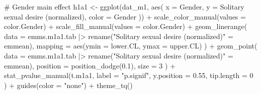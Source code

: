 \documentclass[
  bookmarksnumbered]{article}
\newenvironment{Shaded}{\begin{snugshade}}{\end{snugshade}}
\newcommand{\AttributeTok}[1]{\textcolor[rgb]{0.80,0.80,0.80}{#1}}
\newcommand{\CommentTok}[1]{\textcolor[rgb]{0.50,0.62,0.50}{#1}}
\newcommand{\DecValTok}[1]{\textcolor[rgb]{0.86,0.86,0.80}{#1}}
\newcommand{\FloatTok}[1]{\textcolor[rgb]{0.75,0.75,0.82}{#1}}
\newcommand{\FunctionTok}[1]{\textcolor[rgb]{0.94,0.94,0.56}{#1}}
\newcommand{\NormalTok}[1]{\textcolor[rgb]{0.80,0.80,0.80}{#1}}
\newcommand{\OtherTok}[1]{\textcolor[rgb]{0.94,0.94,0.56}{#1}}
\newcommand{\SpecialCharTok}[1]{\textcolor[rgb]{0.86,0.64,0.64}{#1}}
\newcommand{\StringTok}[1]{\textcolor[rgb]{0.80,0.58,0.58}{#1}}
\begin{document}
\begin{Shaded}
\begin{Highlighting}[]
\CommentTok{\# Gender main effect}
\NormalTok{h1a1 }\OtherTok{\textless{}{-}} \FunctionTok{ggplot}\NormalTok{(dat\_m1, }\FunctionTok{aes}\NormalTok{(}
  \AttributeTok{x =}\NormalTok{ Gender, }\AttributeTok{y =} \StringTok{\textasciigrave{}}\AttributeTok{Solitary sexual desire (normalized)}\StringTok{\textasciigrave{}}\NormalTok{,}
  \AttributeTok{color =}\NormalTok{ Gender}
\NormalTok{)) }\SpecialCharTok{+}
  \FunctionTok{scale\_color\_manual}\NormalTok{(}\AttributeTok{values =}\NormalTok{ color.Gender) }\SpecialCharTok{+}
  \FunctionTok{scale\_fill\_manual}\NormalTok{(}\AttributeTok{values =}\NormalTok{ color.Gender) }\SpecialCharTok{+}
  \FunctionTok{geom\_linerange}\NormalTok{(}
    \AttributeTok{data =}\NormalTok{ emms.m1a1.tab }\SpecialCharTok{|\textgreater{}}
      \FunctionTok{rename}\NormalTok{(}\StringTok{"Solitary sexual desire (normalized)"} \OtherTok{=}\NormalTok{ emmean),}
    \AttributeTok{mapping =} \FunctionTok{aes}\NormalTok{(}\AttributeTok{ymin =}\NormalTok{ lower.CL, }\AttributeTok{ymax =}\NormalTok{ upper.CL)}
\NormalTok{  ) }\SpecialCharTok{+}
  \FunctionTok{geom\_point}\NormalTok{(}
    \AttributeTok{data =}\NormalTok{ emms.m1a1.tab }\SpecialCharTok{|\textgreater{}}
      \FunctionTok{rename}\NormalTok{(}\StringTok{"Solitary sexual desire (normalized)"} \OtherTok{=}\NormalTok{ emmean),}
    \AttributeTok{position =} \FunctionTok{position\_dodge}\NormalTok{(}\FloatTok{0.1}\NormalTok{),}
    \AttributeTok{size =} \DecValTok{3}
\NormalTok{  ) }\SpecialCharTok{+}
  \FunctionTok{stat\_pvalue\_manual}\NormalTok{(t.m1a1,}
    \AttributeTok{label =} \StringTok{"p.signif"}\NormalTok{,}
    \AttributeTok{y.position =} \FloatTok{0.55}\NormalTok{,}
    \AttributeTok{tip.length =} \DecValTok{0}
\NormalTok{  ) }\SpecialCharTok{+}
  \FunctionTok{guides}\NormalTok{(}\AttributeTok{color =} \StringTok{"none"}\NormalTok{) }\SpecialCharTok{+}
  \FunctionTok{theme\_tq}\NormalTok{()}


\end{Highlighting}
\end{Shaded}
\end{document}
